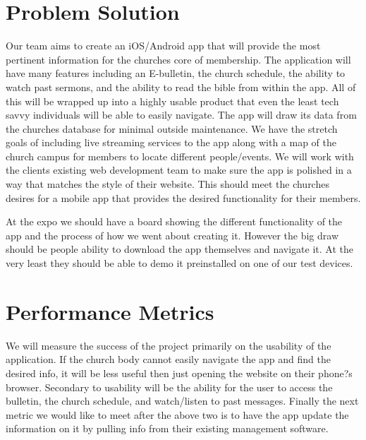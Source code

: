 \documentclass[letterpaper,10pt,draftclsnofoot,onecolumn,titlepage]{IEEEtran}
\begin{document}
	\section*{Problem Solution}
	Our team aims to create an iOS/Android app that will provide the most pertinent information for the churches core of membership. 
	The application will have many features including an E-bulletin, the church schedule, the ability to watch past sermons, and the ability to read the bible from within the app. 
	All of this will be wrapped up into a highly usable product that even the least tech savvy individuals will be able to easily navigate. 
	The app will draw its data from the churches database for minimal outside maintenance. 
	We have the stretch goals of including live streaming services to the app along with a map of the church campus for members to locate different people/events.  
	We will work with the clients existing web development team to make sure the app is polished in a way that matches the style of their website. 
	This should meet the churches desires for a mobile app that provides the desired functionality for their members.

	At the expo we should have a board showing the different functionality of the app and the process of how we went about creating it. 
	However the big draw should be people ability to download the app themselves and navigate it. 
	At the very least they should be able to demo it preinstalled on one of our test devices.
	
	\section*{Performance Metrics}
	We will measure the success of the project primarily on the usability of the application. 
	If the church body cannot easily navigate the app and find the desired info, it will be less useful then just opening the website on their phone?s browser. 
	Secondary to usability will be the ability for the user to access the bulletin, the church schedule, and watch/listen to past messages. 
	Finally the next metric we would like to meet after the above two is to have the app update the information on it by pulling info from their existing management software.

 
\end{document}
